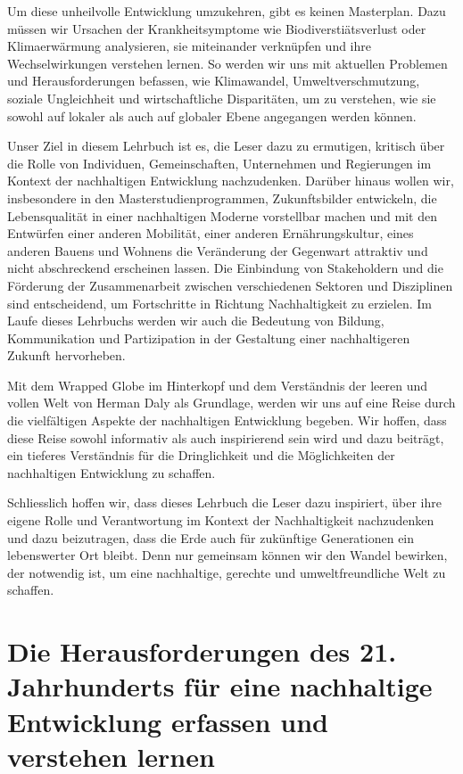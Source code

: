 \documentclass[
]{book}
\begin{document}
Um diese unheilvolle Entwicklung umzukehren, gibt es keinen Masterplan. Dazu müssen wir Ursachen der Krankheitsymptome wie Biodiverstiätsverlust oder Klimaerwärmung analysieren, sie miteinander verknüpfen und ihre Wechselwirkungen verstehen lernen. So werden wir uns mit aktuellen Problemen und Herausforderungen befassen, wie Klimawandel, Umweltverschmutzung, soziale Ungleichheit und wirtschaftliche Disparitäten, um zu verstehen, wie sie sowohl auf lokaler als auch auf globaler Ebene angegangen werden können.

Unser Ziel in diesem Lehrbuch ist es, die Leser dazu zu ermutigen, kritisch über die Rolle von Individuen, Gemeinschaften, Unternehmen und Regierungen im Kontext der nachhaltigen Entwicklung nachzudenken. Darüber hinaus wollen wir, insbesondere in den Masterstudienprogrammen, Zukunftsbilder entwickeln, die Lebensqualität in einer nachhaltigen Moderne vorstellbar machen und mit den Entwürfen einer anderen Mobilität, einer anderen Ernährungskultur, eines anderen Bauens und Wohnens die Veränderung der Gegenwart attraktiv und nicht abschreckend erscheinen lassen. Die Einbindung von Stakeholdern und die Förderung der Zusammenarbeit zwischen verschiedenen Sektoren und Disziplinen sind entscheidend, um Fortschritte in Richtung Nachhaltigkeit zu erzielen. Im Laufe dieses Lehrbuchs werden wir auch die Bedeutung von Bildung, Kommunikation und Partizipation in der Gestaltung einer nachhaltigeren Zukunft hervorheben.

Mit dem Wrapped Globe im Hinterkopf und dem Verständnis der leeren und vollen Welt von Herman Daly als Grundlage, werden wir uns auf eine Reise durch die vielfältigen Aspekte der nachhaltigen Entwicklung begeben. Wir hoffen, dass diese Reise sowohl informativ als auch inspirierend sein wird und dazu beiträgt, ein tieferes Verständnis für die Dringlichkeit und die Möglichkeiten der nachhaltigen Entwicklung zu schaffen.

Schliesslich hoffen wir, dass dieses Lehrbuch die Leser dazu inspiriert, über ihre eigene Rolle und Verantwortung im Kontext der Nachhaltigkeit nachzudenken und dazu beizutragen, dass die Erde auch für zukünftige Generationen ein lebenswerter Ort bleibt. Denn nur gemeinsam können wir den Wandel bewirken, der notwendig ist, um eine nachhaltige, gerechte und umweltfreundliche Welt zu schaffen.

\hypertarget{Teil1}{%
\chapter{Die Herausforderungen des 21. Jahrhunderts für eine nachhaltige Entwicklung erfassen und verstehen lernen}\label{Teil1}}
\end{document}
